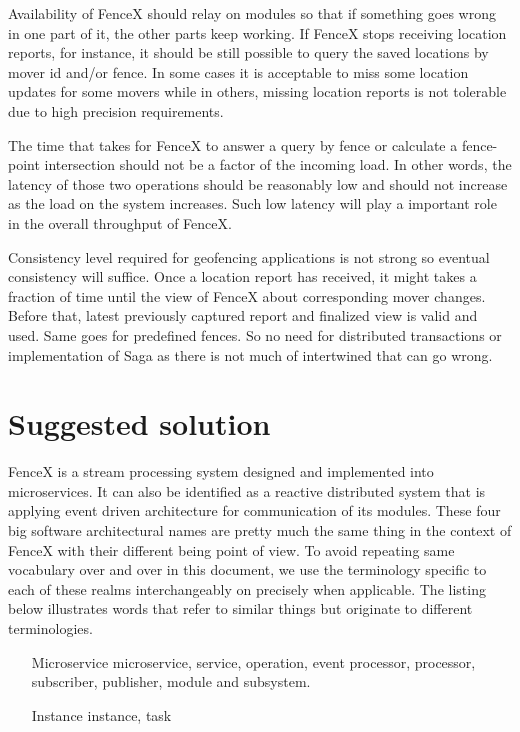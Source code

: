 \documentclass[a4]{report}
\begin{document}
    Availability of FenceX should relay on modules so that if something goes wrong in one part of it, the other parts keep working. If FenceX stops receiving location reports, for instance, it should be still possible to query the saved locations by mover id and/or fence. In some cases it is acceptable to miss some location updates for some movers while in others, missing location reports is not tolerable due to high precision requirements.

    The time that takes for FenceX to answer a query by fence or calculate a fence-point intersection should not be a factor of the incoming load. In other words, the latency of those two operations should be reasonably low and should not increase as the load on the system increases. Such low latency will play a important role in the overall throughput of FenceX.


    Consistency level required for geofencing applications is not strong so eventual consistency will suffice. Once a location report has received, it might takes a fraction of time until the view of FenceX about corresponding mover changes. Before that, latest previously captured report and finalized view is valid and used. Same goes for predefined fences. So no need for distributed transactions or implementation of Saga as there is not much of intertwined that can go wrong.


    \chapter{Suggested solution}
    FenceX is a stream processing system designed and implemented into microservices. It can also be identified as a reactive distributed system that is applying event driven architecture for communication of its modules. These four big software architectural names are pretty much the same thing in the context of FenceX with their different being point of view. To avoid repeating same vocabulary over and over in this document, we use the terminology specific to each of these realms interchangeably on precisely when applicable. The listing below illustrates words that refer to similar things but originate to different terminologies.

    \begin{itemize}
        \item[Microservice] microservice, service, operation, event processor,  processor, subscriber, publisher, module and subsystem.
        \item[Instance] instance, task
    \end{itemize}
\end{document}
